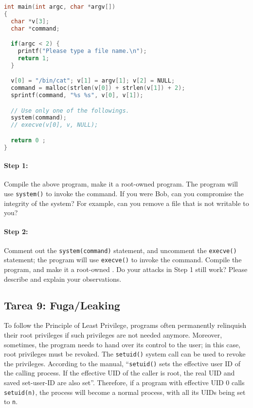 \begin{lstlisting}[language=C, caption=\texttt{catall.c}]
int main(int argc, char *argv[])
{
  char *v[3];
  char *command;

  if(argc < 2) {
    printf("Please type a file name.\n");
    return 1;
  }

  v[0] = "/bin/cat"; v[1] = argv[1]; v[2] = NULL;
  command = malloc(strlen(v[0]) + strlen(v[1]) + 2);
  sprintf(command, "%s %s", v[0], v[1]);

  // Use only one of the followings.
  system(command);
  // execve(v[0], v, NULL);

  return 0 ;
}
\end{lstlisting}


\paragraph{Step 1:} Compile the above program, make it a root-owned
\setuid program. The program will use
{\tt system()} to invoke the command.
If you were Bob, can you compromise the integrity of the system? For example,
can you remove a file that is not writable to you?


\paragraph{Step 2:} Comment out the {\tt system(command)} statement, and
uncomment the {\tt execve()} statement; the program
will use {\tt execve()} to invoke the command. Compile the program, and
make it a root-owned \setuid.
Do your attacks in Step 1 still work? Please describe and explain your observations.



\subsection{Tarea 9: Fuga/Leaking}

To follow the Principle of Least Privilege, \setuid programs often
permanently relinquish their root privileges if such privileges are not
needed anymore. Moreover, sometimes, the program needs to hand over its
control to the user; in this case, root privileges must be revoked.
The {\tt setuid()} system call can be used to revoke the privileges.
According to the manual, ``\texttt{setuid()} sets the effective user ID of
the calling process. If the effective UID of the caller is root, the real
UID and saved set-user-ID are also set''. Therefore, if a \setuid program
with effective UID 0 calls \texttt{setuid(n)}, the process will become a
normal process, with all its UIDs being set to \texttt{n}.

